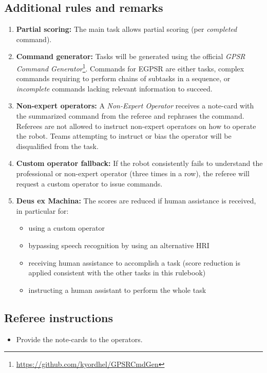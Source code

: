 \subsection*{Additional rules and remarks}
\begin{enumerate}[nosep]
	\item \textbf{Partial scoring:} The main task allows partial scoring (per \emph{completed} command).

	\item \textbf{Command generator:} Tasks will be generated using the official \emph{GPSR Command Generator}\footnote{\url{https://github.com/kyordhel/GPSRCmdGen}}.
	Commands for EGPSR are either \STWO{} tasks, complex commands requiring to perform chains of subtasks in a sequence, or \emph{incomplete} commands lacking relevant information to succeed.

	\item \textbf{Non-expert operators:} A \emph{Non-Expert Operator} receives a note-card with the summarized command from the referee and rephrases the command.
	Referees are not allowed to instruct non-expert operators on how to operate the robot.
	Teams attempting to instruct or bias the operator will be disqualified from the task.

	\item \textbf{Custom operator fallback:} If the robot consistently fails to understand the professional or non-expert operator (three times in a row), the referee will request a custom operator to issue commands.

	\item \textbf{Deus ex Machina:} The scores are reduced if human assistance is received, in particular for:
	\begin{itemize}
		\item using a custom operator
		\item bypassing speech recognition by using an alternative HRI
		\item receiving human assistance to accomplish a task (score reduction is applied consistent with the other tasks in this rulebook)
		\item instructing a human assistant to perform the whole task
	\end{itemize}
\end{enumerate}

\subsection*{Referee instructions}
\begin{itemize}
	\item Provide the note-cards to the operators.
\end{itemize}

